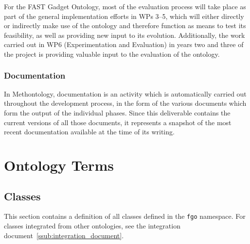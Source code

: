 \documentclass{article}
\begin{document}
For the FAST Gadget Ontology, most of the evaluation process will take place as part of the general implementation efforts in WPs 3--5, which will either directly or indirectly make use of the ontology and therefore function as means to test its feasibility, as well as providing new input to its evolution. Additionally, the work carried out in WP6 (Experimentation and Evaluation) in years two and three of the project is providing valuable input to the evaluation of the ontology.

\subsubsection{Documentation} %
\label{ssub:documentation}

In Methontology, documentation is an activity which is automatically carried out throughout the development process, in the form of the various documents which form the output of the individual phases. Since this deliverable contains the current versions of all those documents, it represents a snapshot of the most recent documentation available at the time of its writing.



% 


\clearpage
{}
\section{Ontology Terms}
\label{sec:ontology_terms}
\subsection{Classes} %
\label{sub:classes}

This section contains a definition of all classes defined in the \texttt{fgo} namespace. For classes integrated from other ontologies, see the integration document~\ref{ssub:integration_document}.
\end{document}
